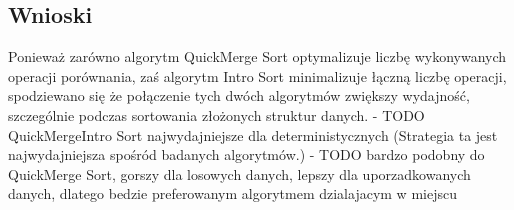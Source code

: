 \begin{figure}[]
	\centering
	
	\caption[]{}
	\label{fig:quick-merge-intro-sort-nondeterministic-pivot-random-sorted}
\end{figure}

\begin{figure}[]
	\centering
	
	\caption[]{}
	\label{fig:quick-merge-intro-sort-nondeterministic-pivot-density}
\end{figure}

\begin{figure}[]
	\centering
	
	\caption[]{}
	\label{fig:quick-merge-intro-sort-nondeterministic-pivot-density-sorted}
\end{figure}

\subsection{Wnioski}
Ponieważ zarówno algorytm QuickMerge Sort optymalizuje liczbę wykonywanych operacji porównania, zaś algorytm Intro Sort minimalizuje łączną liczbę operacji, spodziewano się że połączenie tych dwóch algorytmów zwiększy wydajność, szczególnie podczas sortowania złożonych struktur danych.
- TODO QuickMergeIntro Sort najwydajniejsze dla deterministycznych (Strategia ta jest najwydajniejsza spośród badanych algorytmów.)
- TODO bardzo podobny do QuickMerge Sort, gorszy dla losowych danych, lepszy dla uporzadkowanych danych, dlatego bedzie preferowanym algorytmem dzialajacym w miejscu